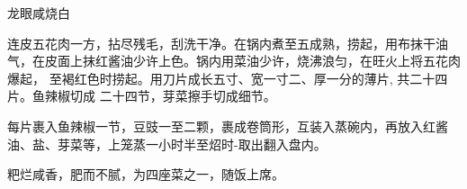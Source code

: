 \begin{recipe}{龙眼咸烧白}

\ingredients


\cooking

\step 连皮五花肉一方，拈尽残毛，刮洗干净。在锅内煮至五成熟，捞起，用布抹干油
气，在皮面上抹红酱油少许上色。锅内用菜油少许，烧沸浪匀，在旺火上将五花肉爆起，
至褐红色时捞起。用刀片成长五寸、宽一寸二、厚一分的薄片, 共二十四片。鱼辣椒切成
二十四节，芽菜擦手切成细节。

\step 每片裹入鱼辣椒一节，豆豉一至二颗，裹成卷筒形，互装入蒸碗内，再放入红酱
油、盐、芽菜等，上笼蒸一小时半至炤时-取出翻入盘内。

\notes

粑烂咸香，肥而不腻，为四座菜之一，随饭上席。

\end{recipe}

